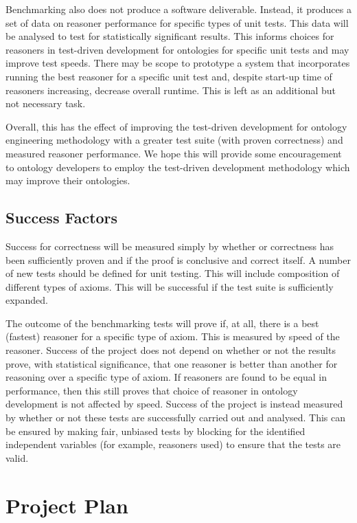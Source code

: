 \documentclass[draft]{sig-alternate}
\begin{document}
Benchmarking also does not produce a software deliverable. Instead, it produces a set of data on reasoner performance for specific types of unit tests. This data will be analysed to test for statistically significant results. This informs choices for reasoners in test-driven development for ontologies for specific unit tests and may improve test speeds. There may be scope to prototype a system that incorporates running the best reasoner for a specific unit test and, despite start-up time of reasoners increasing, decrease overall runtime. This is left as an additional but not necessary task.

Overall, this has the effect of improving the test-driven development for ontology engineering methodology with a greater test suite (with proven correctness) and measured reasoner performance. We hope this will provide some encouragement to ontology developers to employ the test-driven development methodology which may improve their ontologies.

\subsection{Success Factors}

Success for correctness will be measured simply by whether or correctness has been sufficiently proven and if the proof is conclusive and correct itself. A number of new tests should be defined for unit testing. This will include composition of different types of axioms. This will be successful if the test suite is sufficiently expanded.

The outcome of the benchmarking tests will prove if, at all, there is a best (fastest) reasoner for a specific type of axiom. This is measured by speed of the reasoner. Success of the project does not depend on whether or not the results prove, with statistical significance, that one reasoner is better than another for reasoning over a specific type of axiom. If reasoners are found to be equal in performance, then this still proves that choice of reasoner in ontology development is not affected by speed. Success of the project is instead measured by whether or not these tests are successfully carried out and analysed. This can be ensured by making fair, unbiased tests by blocking for the identified independent variables (for example, reasoners used) to ensure that the tests are valid.

\section{Project Plan}
\end{document}
